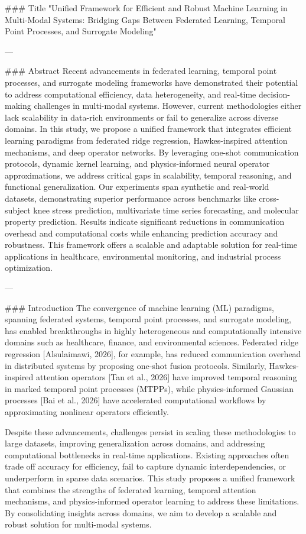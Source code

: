 ### Title  
"Unified Framework for Efficient and Robust Machine Learning in Multi-Modal Systems: Bridging Gaps Between Federated Learning, Temporal Point Processes, and Surrogate Modeling"

---

### Abstract  
Recent advancements in federated learning, temporal point processes, and surrogate modeling frameworks have demonstrated their potential to address computational efficiency, data heterogeneity, and real-time decision-making challenges in multi-modal systems. However, current methodologies either lack scalability in data-rich environments or fail to generalize across diverse domains. In this study, we propose a unified framework that integrates efficient learning paradigms from federated ridge regression, Hawkes-inspired attention mechanisms, and deep operator networks. By leveraging one-shot communication protocols, dynamic kernel learning, and physics-informed neural operator approximations, we address critical gaps in scalability, temporal reasoning, and functional generalization. Our experiments span synthetic and real-world datasets, demonstrating superior performance across benchmarks like cross-subject knee stress prediction, multivariate time series forecasting, and molecular property prediction. Results indicate significant reductions in communication overhead and computational costs while enhancing prediction accuracy and robustness. This framework offers a scalable and adaptable solution for real-time applications in healthcare, environmental monitoring, and industrial process optimization.

---

### Introduction  
The convergence of machine learning (ML) paradigms, spanning federated systems, temporal point processes, and surrogate modeling, has enabled breakthroughs in highly heterogeneous and computationally intensive domains such as healthcare, finance, and environmental sciences. Federated ridge regression [Alsulaimawi, 2026], for example, has reduced communication overhead in distributed systems by proposing one-shot fusion protocols. Similarly, Hawkes-inspired attention operators [Tan et al., 2026] have improved temporal reasoning in marked temporal point processes (MTPPs), while physics-informed Gaussian processes [Bai et al., 2026] have accelerated computational workflows by approximating nonlinear operators efficiently.

Despite these advancements, challenges persist in scaling these methodologies to large datasets, improving generalization across domains, and addressing computational bottlenecks in real-time applications. Existing approaches often trade off accuracy for efficiency, fail to capture dynamic interdependencies, or underperform in sparse data scenarios. This study proposes a unified framework that combines the strengths of federated learning, temporal attention mechanisms, and physics-informed operator learning to address these limitations. By consolidating insights across domains, we aim to develop a scalable and robust solution for multi-modal systems.

